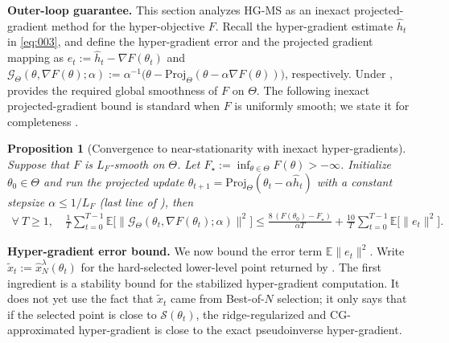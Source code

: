 \documentclass{article}
\theoremstyle{normaltheorem}
\newtheorem{proposition}[proposition]{Proposition}
\newcommand{\calS}{\mathcal{S}}
\begin{document}
\textbf{Outer-loop guarantee.}
This section analyzes \textsc{HG-MS} as an inexact projected-gradient method for the hyper-objective \(F\).
Recall the hyper-gradient estimate $\widehat h_t$ in \eqref{eq:003}, and define the
hyper-gradient error and the projected gradient mapping as $e_t:=\widehat h_t-\nabla F(\theta_t)$ and $\mathcal G_{\Theta}(\theta,\nabla F(\theta);\alpha)
:=\alpha^{-1}\big(\theta-\mathrm{Proj}_{\Theta}(\theta-\alpha\nabla F(\theta))\big)$, respectively.
Under ,  provides the required global smoothness of \(F\) on \(\Theta\).
The following inexact projected-gradient bound is standard when $F$ is uniformly smooth; we state it for completeness
\citep[e.g.,][]{ghadimi2016mini,nesterov2003introductory}.
\begin{proposition}[Convergence to near-stationarity with inexact hyper-gradients]\label{prop:outer-inexact}
Suppose that $F$ is $L_F$-smooth on $\Theta$.
Let $F_\star:=\inf_{\theta\in\Theta}F(\theta)>-\infty$.
Initialize $\theta_0\in\Theta$ and run the projected update
$\theta_{t+1}=\mathrm{Proj}_{\Theta}(\theta_t-\alpha \widehat h_t)$ with a constant
stepsize $\alpha\le 1/L_F$ (last line of ), then
\begin{align}
\forall\ T \geq 1, \quad \frac{1}{T}\sum_{t=0}^{T-1}\mathbb E\big[\|\mathcal G_{\Theta}(\theta_t,\nabla F(\theta_t);\alpha)\|^2\big]\le
\frac{8\,(F(\theta_0)-F_\star)}{\alpha T}+ \frac{10}{T}\sum_{t=0}^{T-1}\mathbb E\big[\|e_t\|^2\big].
\label{eq:outer-inexact}
\end{align}
\end{proposition}


\textbf{Hyper-gradient error bound.}
We now bound the error term \(\mathbb E\|e_t\|^2\).
Write \(\tilde x_t:=\hat{x}_N^\lambda(\theta_t)\) for the hard-selected lower-level point returned by
. The first ingredient is a stability bound for the stabilized hyper-gradient computation. It
does not yet use the fact that \(\tilde x_t\) came from Best-of-\(N\) selection; it only says that if the selected point is
close to \(\calS(\theta_t)\), the ridge-regularized and CG-approximated hyper-gradient is close to the exact
pseudoinverse hyper-gradient.
\end{document}
